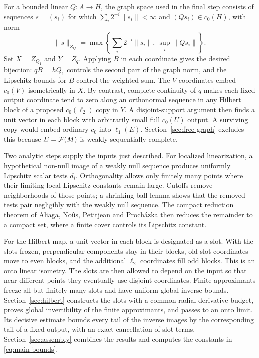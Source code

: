 For a bounded linear \(Q:A\to H\), the graph space used in the final
step consists of sequences \(s=(s_i)\) for which
\(\sum_i2^{-i}\|s_i\|<\infty\) and \((Qs_i)\in c_0(H)\), with norm
\[
 \|s\|_{Z_Q}
 =\max\left\{\sum_i2^{-i}\|s_i\|,\ \sup_i\|Qs_i\|\right\}.
\]
Set \(X=Z_{Q_1}\) and \(Y=Z_q\). Applying \(B\) in each coordinate
gives the desired bijection: \(qB=hQ_1\) controls the second part of
the graph norm, and the Lipschitz bounds for \(B\) control the weighted
sum. The \(V\) coordinates embed \(c_0(V)\) isometrically in \(X\).
By contrast, complete continuity of \(q\) makes each fixed output
coordinate tend to zero along an orthonormal sequence in any Hilbert
block of a proposed \(c_0(\ell_2)\) copy in \(Y\).
A disjoint-support argument then finds a unit vector in each block
with arbitrarily small full \(c_0(U)\) output. A surviving copy would embed
ordinary \(c_0\) into \(\ell_1(E)\). Section~\ref{sec:free-graph}
excludes this because \(E=\mathcal F(M)\) is weakly sequentially complete.

Two analytic steps supply the inputs just described. For localized
linearization, a hypothetical non-null image of a weakly null
sequence produces uniformly Lipschitz scalar tests \(d_i\).
Orthogonality allows only finitely many points where their limiting
local Lipschitz constants remain large. Cutoffs remove neighborhoods
of those points; a shrinking-ball lemma shows that the removed tests
pair negligibly with the weakly null sequence. The compact reduction
theorem of Aliaga, No\^us, Petitjean and Proch\'azka
\cite[Theorem~2.3]{ANPP21} then reduces the remainder to a compact set,
where a finite cover controls its Lipschitz constant.

For the Hilbert map, a unit vector in each block is designated as a
slot. With the slots frozen, perpendicular components stay in their
blocks, old slot coordinates move to even blocks, and the additional
\(\ell_2\) coordinates fill odd blocks. This is an onto linear
isometry. The slots are then allowed to depend on the input so that
near different points they eventually use disjoint coordinates.
Finite approximants freeze all but finitely many slots and have
uniform global inverse bounds. Section~\ref{sec:hilbert} constructs the slots with a common radial
derivative budget, proves global invertibility of the finite approximants,
and passes to an onto limit. Its decisive estimate bounds every tail of the
inverse images by the corresponding tail of a fixed output, with an
exact cancellation of slot terms. Section~\ref{sec:assembly} combines
the results and computes the constants in \eqref{eq:main-bounds}.
